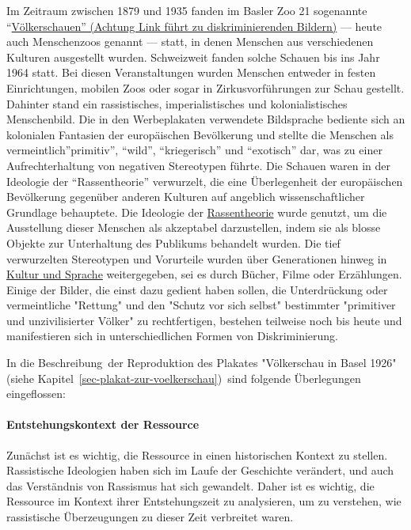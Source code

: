 \documentclass[
  letterpaper,
  DIV=11,
  numbers=noendperiod]{scrartcl}
\let\oldparagraph\paragraph
\renewcommand{\paragraph}[1]{\oldparagraph{#1}\mbox{}}
\begin{document}
Im Zeitraum zwischen 1879 und 1935 fanden im Basler Zoo 21 sogenannte
``\href{https://www.baslerstadtbuch.ch/stadtbuch/1992/1992_2247.html}{Völkerschauen''
(Achtung Link führt zu diskriminierenden Bildern)} --- heute auch
Menschenzoos genannt --- statt, in denen Menschen aus verschiedenen
Kulturen ausgestellt wurden. Schweizweit fanden solche Schauen bis ins
Jahr 1964 statt. Bei diesen Veranstaltungen wurden Menschen entweder in
festen Einrichtungen, mobilen Zoos oder sogar in Zirkusvorführungen zur
Schau gestellt. Dahinter stand ein rassistisches, imperialistisches und
kolonialistisches Menschenbild. Die in den Werbeplakaten verwendete
Bildsprache bediente sich an kolonialen Fantasien der europäischen
Bevölkerung und stellte die Menschen als vermeintlich''primitiv'',
``wild'', ``kriegerisch'' und ``exotisch'' dar, was zu einer
Aufrechterhaltung von negativen Stereotypen führte. Die Schauen waren in
der Ideologie der ``Rassentheorie'' verwurzelt, die eine Überlegenheit
der europäischen Bevölkerung gegenüber anderen Kulturen auf angeblich
wissenschaftlicher Grundlage behauptete. Die Ideologie der
\href{https://hls-dhs-dss.ch/de/articles/060537/2024-04-08/}{Rassentheorie}
wurde genutzt, um die Ausstellung dieser Menschen als akzeptabel
darzustellen, indem sie als blosse Objekte zur Unterhaltung des
Publikums behandelt wurden. Die tief verwurzelten Stereotypen und
Vorurteile wurden über Generationen hinweg in
\href{https://mirsindvoda.ch/voelkerschauen-in-der-schweiz/}{Kultur und
Sprache} weitergegeben, sei es durch Bücher, Filme oder Erzählungen.
Einige der Bilder, die einst dazu gedient haben sollen, die
Unterdrückung oder vermeintliche "Rettung" und den "Schutz vor sich
selbst" bestimmter "primitiver und unzivilisierter Völker" zu
rechtfertigen, bestehen teilweise noch bis heute und manifestieren sich
in unterschiedlichen Formen von Diskriminierung.

In die Beschreibung~der Reproduktion des Plakates "Völkerschau in Basel
1926" (siehe Kapitel~\ref{sec-plakat-zur-voelkerschau})~sind folgende
Überlegungen eingeflossen:

\paragraph{Entstehungskontext der
Ressource}\label{entstehungskontext-der-ressource}

Zunächst ist es wichtig, die Ressource in einen historischen Kontext zu
stellen. Rassistische Ideologien haben sich im Laufe der Geschichte
verändert, und auch das Verständnis von Rassismus hat sich gewandelt.
Daher ist es wichtig, die Ressource im Kontext ihrer Entstehungszeit zu
analysieren, um zu verstehen, wie rassistische Überzeugungen zu dieser
Zeit verbreitet waren.
\end{document}
